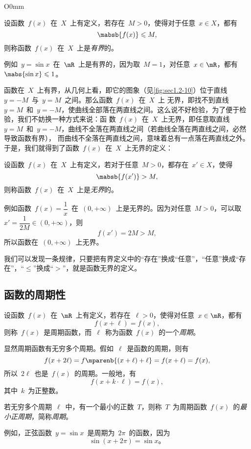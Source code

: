 \fixwrapfloatsep
\begin{wrapfigure}[9]{O}{0mm}
\somefigure
\caption{有界函数}\label{fig:sec1.2-10}
\end{wrapfigure}

设函数~$f(x)$~在~$X$~上有定义，若存在~$M>0$，使得对于任意~$x\in X$，都有
\[
  \mabsb{f(x)}\leq M,
\]
则称函数~$f(x)$~在~$X$~上是\emph{有界}的。

例如~$y=\sin x$~在~$\mR$~上是有界的，因为取~$M=1$，对任意~$x\in\mR$，都有~$\mabs{\sin x}\leq1$。

函数在~$X$~上有界，从几何上看，即它的图象（见\ref{fig:sec1.2-10}）位于直线~$y=-M$~与~$y=M$~之间。那么函数~$f(x)$~在~$X$~上
无界，即找不到直线~$y=M$~和~$y=-M$，使曲线全部落在两直线之间。这么说不好检验，为了便于检验，我们不妨换一种方式来说：函
数~$f(x)$~在~$X$~上无界，即任意取直线~$y=M$~和~$y=-M$，曲线不全落在两直线之间（若曲线全落在两直线之间，必然导致函数有界），%
而曲线不全落在两直线之间，意味着总有一点落在两直线之外。%
于是，我们就得到了函数~$f(x)$~在~$X$~上无界的定义：

设函数~$f(x)$~在~$X$~上有定义，若对于任意~$M>0$，都存在~$x'\in X$，使得
\[
  \mabsb{f(x')}>M,
\]
则称函数~$f(x)$~在~$X$~上是\emph{无界}的。

例如函数~$f(x)=\dfrac1x$~在~$(0,+\infty)$~上是无界的。因为对任意~$M>0$，可以取~$x'=\dfrac1{2M}\in(0,+\infty)$，则
\[
  f(x')=2M>M,
\]
所以函数在~$(0,+\infty)$~上无界。

我们可以发现一条规律，只要把有界定义中的“存在”换成“任意”，“任意”换成“存在”，“$\leq$”换成“$>$”，就是函数无界的定义。

\subsection{函数的周期性}

设函数~$f(x)$~在~$\mR$~上有定义，若存在~$\ell>0$，使得对任意~$x\in\mR$，都有
\[
  f(x+\ell)=f(x),
\]
则称~$f(x)$~是周期函数，而~$\ell$~称为函数~$f(x)$~的一个\emph{周期}。

显然周期函数有无穷多个周期。假如~$\ell$~是函数的周期，则有
\[
  f(x+2\ell)=f\mparenb{(x+\ell)+\ell}=f(x+\ell)=f(x),
\]
所以~$2\ell$~也是~$f(x)$~的周期。一般地，有
\[
  f(x+k\cdot\ell)=f(x),
\]
其中~$k$~为正整数。

若无穷多个周期~$\ell$~中，有一个最小的正数~$T$，则称~$T$~为周期函数~$f(x)$~的\emph{最小正周期}，简称\emph{周期}。

例如，正弦函数~$y=\sin x$~是周期为~$2\pi$~的函数，因为
\[
  \sin(x+2\pi)=\sin x。
\]

